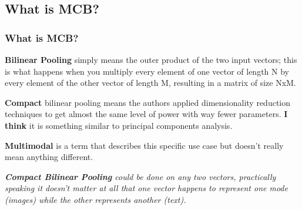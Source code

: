 \documentclass{beamer}
\begin{document}
\subsection{What is MCB?}
\begin{frame}
\frametitle{What is MCB?}
\textbf{Bilinear Pooling} simply means the outer product of the two input vectors; this is what happens when you multiply every element of one vector of length N by every element of the other vector of length M, resulting in a matrix of size NxM.

\vspace{0.2cm}

\textbf{Compact} bilinear pooling means the authors applied dimensionality reduction techniques to get almost the same level of power with way fewer parameters. \textbf{I think} it is  something similar to principal components analysis.

\vspace{0.2cm}

\textbf{Multimodal} is a term that describes this specific use case but doesn’t really mean anything different.

\vspace{0.2cm}

\emph{\color{red}\textbf{Compact Bilinear Pooling} could be done on any two vectors, practically speaking it doesn’t matter at all that one vector happens to represent one mode (images) while the other represents another (text).}\color{black}
\end{frame}

\end{document}
